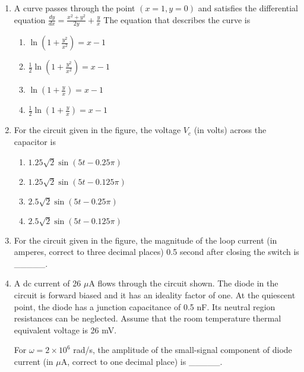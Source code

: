 \documentclass{article}
\begin{document}
\begin{enumerate}
\item A curve passes through the point $(x = 1, y = 0)$ and satisfies the differential equation
$\frac{dy}{dx} = \frac{x^2 + y^2}{2y} + \frac{y}{x}$
The equation that describes the curve is
\begin{enumerate}
\item $\ln\left(1 + \frac{y^2}{x^2}\right) = x - 1$
\item $\frac{1}{2}\ln\left(1 + \frac{y^2}{x^2}\right) = x - 1$
\item $\ln\left(1 + \frac{y}{x}\right) = x - 1$
\item $\frac{1}{2}\ln\left(1 + \frac{y}{x}\right) = x - 1$
\end{enumerate}

\item For the circuit given in the figure, the voltage $V_c$ (in volts) across the capacitor is
\begin{figure}[H]
    \centering
    
    \caption{}
    \label{fig:q45}
\end{figure}
\begin{enumerate}
\item $1.25\sqrt{2} \sin(5t-0.25\pi)$
\item $1.25\sqrt{2} \sin(5t-0.125\pi)$
\item $2.5\sqrt{2} \sin(5t-0.25\pi)$
\item $2.5\sqrt{2} \sin(5t-0.125\pi)$
\end{enumerate}

\item For the circuit given in the figure, the magnitude of the loop current (in amperes, correct to three decimal places) 0.5 second after closing the switch is \_\_\_\_\_.
\begin{figure}[H]
    \centering
    
    \caption{}
    \label{fig:q46}
\end{figure}
\item A dc current of 26 $\mu$A flows through the circuit shown. The diode in the circuit is forward biased and it has an ideality factor of one. At the quiescent point, the diode has a junction capacitance of 0.5 nF. Its neutral region resistances can be neglected. Assume that the room temperature thermal equivalent voltage is 26 mV.
\begin{figure}[H]
    \centering
    
    \caption{}
    \label{fig:q47}
\end{figure}
For $\omega = 2 \times 10^6$ rad/s, the amplitude of the small-signal component of diode current (in $\mu$A, correct to one decimal place) is \_\_\_\_\_.


\end{enumerate}
\end{document}
